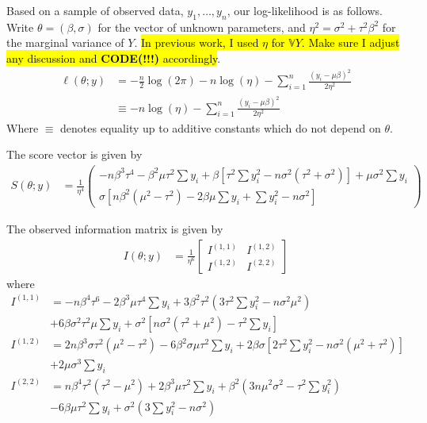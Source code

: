\documentclass[11pt, oneside]{article}   	%
\newcommand{\bV}{\mathbb{V}}
\begin{document}
\begin{appendices}
    Based on a sample of observed data, $y_1,\ldots, y_n$, our log-likelihood is as follows. Write $\theta = (\beta, \sigma)$ for the vector of unknown parameters, and $\eta^2 = \sigma^2 + \tau^2 \beta^2$ for the marginal variance of $Y$. \hl{In previous work, I used $\eta$ for $\bV Y$. Make sure I adjust any discussion and \textbf{CODE(!!!)} accordingly}.
    \begin{align}
        \ell(\theta; y) &= - \frac{n}{2} \log (2 \pi) - n \log (\eta) - \sum_{i=1}^n \frac{(y_i - \mu \beta)^2}{2 \eta^2}\\
        &\equiv -n \log (\eta) - \sum_{i=1}^n \frac{(y_i - \mu \beta)^2}{2 \eta^2}
    \end{align}
    Where $\equiv$ denotes equality up to additive constants which do not depend on $\theta$.

    The score vector is given by
    \begin{align}
        S(\theta; y) &= \frac{1}{\eta^4}\begin{pmatrix}
            - n \beta^3 \tau^4 - \beta^2 \mu \tau^2 \sum y_i + \beta [\tau^2 \sum y_i^2 - n \sigma^2 (\tau^2 + \sigma^2)] + \mu \sigma^2 \sum y_i\\
            \sigma[n \beta^2 (\mu^2 - \tau^2)  - 2 \beta \mu \sum y_i + \sum y_i^2 - n \sigma^2]
        \end{pmatrix}
    \end{align}

    The observed information matrix is given by
    \begin{align}
        I(\theta; y) &= \frac{1}{\eta^6} \begin{bmatrix}
            I^{(1,1)} & I^{(1,2)}\\
            I^{(1,2)} & I^{(2,2)}
        \end{bmatrix}
    \end{align}
    where
    \begin{align}
        I^{(1,1)} & = - n \beta^4 \tau^6 - 2 \beta^3 \mu \tau^4 \sum y_i + 3 \beta^2 \tau^2 (3 \tau^2 \sum y_i^2 - n \sigma^2 \mu^2) \\
        & + 6 \beta \sigma^2 \tau^2 \mu \sum y_i + \sigma^2 [n \sigma^2 (\tau^2 + \mu^2) - \tau^2 \sum y_i] \nonumber \\
        I^{(1,2)} &= 2 n \beta^3 \sigma \tau^2 (\mu^2 - \tau^2) - 6 \beta^2 \sigma \mu \tau^2 \sum y_i + 2 \beta \sigma [2 \tau^2 \sum y_i^2 - n \sigma^2 (\mu^2 + \tau^2)] \\
        & + 2 \mu \sigma^3 \sum y_i \nonumber \\
        I^{(2,2)} &= n \beta^4 \tau^2 (\tau^2 - \mu^2) + 2 \beta^3 \mu \tau^2 \sum y_i + \beta^2 (3 n \mu^2 \sigma^2 - \tau^2 \sum y_i^2) \\
        & - 6 \beta \mu \tau^2 \sum y_i + \sigma^2 (3 \sum y_i^2 - n \sigma^2) \nonumber
    \end{align}



\end{appendices}
\end{document}
